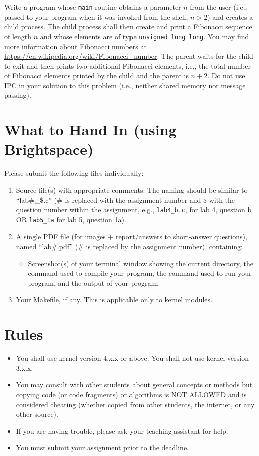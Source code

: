 \documentclass{article}
\begin{document}
Write a program whose \texttt{main} routine obtains a parameter $n$ from the user (i.e., passed to your program when it was invoked from the shell, $n > 2$) and creates a child process. The child process shall then create and print a Fibonacci sequence of length $n$ and whose elements are of type \texttt{unsigned long long}. You may find more information about Fibonacci numbers at \href{https://en.wikipedia.org/wiki/Fibonacci_number}{https://en.wikipedia.org/wiki/Fibonacci\_number}. The parent waits for the child to exit and then prints two additional Fibonacci elements, i.e., the total number of Fibonacci elements printed by the child and the parent is $n+2$. Do not use IPC in your solution to this problem (i.e., neither shared memory nor message passing).


\section*{What to Hand In (using Brightspace)}

Please submit the following files individually:

\begin{enumerate}
    \item Source file(s) with appropriate comments. The naming should be similar to ``lab\#\_\$.c'' (\# is replaced with the assignment number and \$ with the question number within the assignment, e.g., \texttt{lab4\_b.c}, for lab 4, question b OR \texttt{lab5\_1a} for lab 5, question 1a).
    \item A single PDF file (for images + report/answers to short-answer questions), named ``lab\#.pdf'' (\# is replaced by the assignment number), containing:
    \begin{itemize}
        \item Screenshot(s) of your terminal window showing the current directory, the command used to compile your program, the command used to run your program, and the output of your program.
    \end{itemize}
    \item Your Makefile, if any. This is applicable only to kernel modules.
\end{enumerate}

\section*{Rules}

\begin{itemize}
    \item You shall use kernel version 4.x.x or above. You shall not use kernel version 3.x.x.
    \item You may consult with other students about general concepts or methods but copying code (or code fragments) or algorithms is NOT ALLOWED and is considered cheating (whether copied from other students, the internet, or any other source).
    \item If you are having trouble, please ask your teaching assistant for help.
    \item You must submit your assignment prior to the deadline.
\end{itemize}
\end{document}
